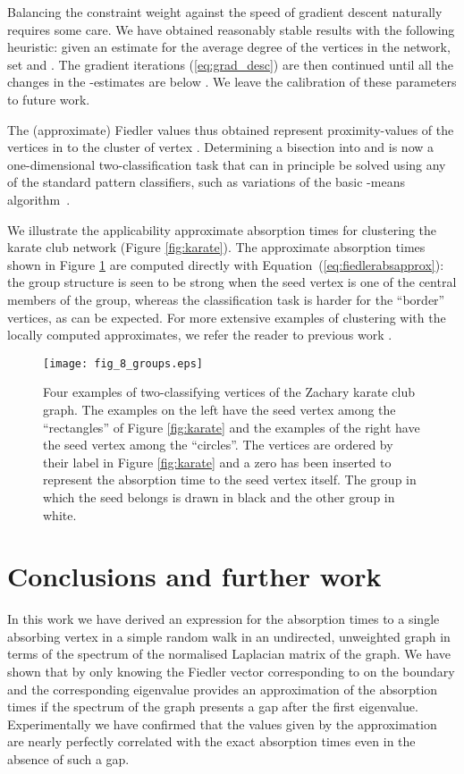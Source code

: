 \documentclass{article}
\begin{document}
Balancing the constraint weight  against the speed of gradient
descent  naturally requires some care.  We have obtained
reasonably stable results with the following heuristic: given an
estimate  for the average degree of the vertices in the
network, set  and . The gradient
iterations (\ref{eq:grad_desc}) are then continued until all the
changes in the -estimates are below .  We
leave the calibration of these parameters to future work.

The (approximate) Fiedler values thus obtained represent
proximity-values of the vertices in  to the cluster of vertex .
Determining a bisection into  and  is now a
one-dimensional two-classification task that can in principle be
solved using any of the standard pattern classifiers, such as
variations of the basic -means algorithm~\cite{HaWo79}.

We illustrate the applicability approximate absorption times for
clustering the karate club network (Figure \ref{fig:karate}).  The
approximate absorption times shown in Figure \ref{fig:karateclass} are
computed directly with Equation~(\ref{eq:fiedlerabsapprox}): the group
structure is seen to be strong when the seed vertex is one of the
central members of the group, whereas the classification task is
harder for the ``border'' vertices, as can be expected. For more
extensive examples of clustering with the locally computed
approximates, we refer the reader to previous work \cite{OrSc05}.

\begin{figure}
\centerline{\texttt{[image: fig\_8\_groups.eps]}}
\caption{Four examples of two-classifying vertices of the Zachary
  karate club graph. The examples on the left have the seed vertex
  among the ``rectangles'' of Figure \ref{fig:karate} and the examples
  of the right have the seed vertex among the ``circles''. The
  vertices are ordered by their label in Figure \ref{fig:karate} and a
  zero has been inserted to represent the absorption time to the seed
  vertex itself. The group in which the seed belongs is drawn in black
  and the other group in white.}
\label{fig:karateclass}
\end{figure}

\section{Conclusions and further work}

In this work we have derived an expression for the absorption times to
a single absorbing vertex  in a simple random walk in an
undirected, unweighted graph in terms of the spectrum of the
normalised Laplacian matrix of the graph. We have shown that by
only knowing the Fiedler vector corresponding to  on the boundary and
the corresponding eigenvalue provides an approximation of the
absorption times if the spectrum of the graph presents a gap after the
first eigenvalue. Experimentally we have confirmed that the values given
by the approximation are nearly perfectly correlated with the exact
absorption times even in the absence of such a gap. 
\end{document}
